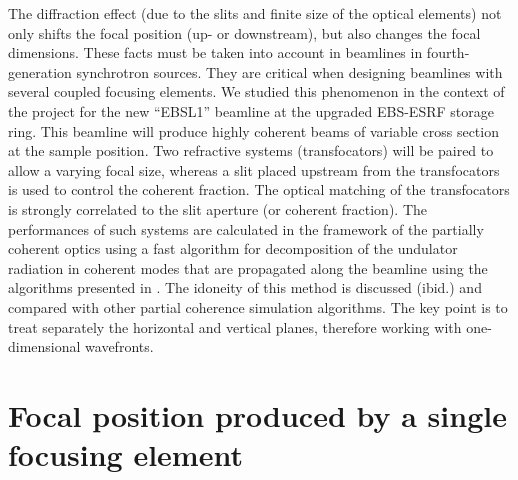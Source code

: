 \documentclass[doublecol]{epl2}
\begin{document}
The diffraction effect (due to the slits and finite size of the optical elements) not only shifts the focal position (up- or downstream), but also changes the focal dimensions. These facts must be taken into account in beamlines in fourth-generation synchrotron sources. They are critical when designing beamlines with several coupled focusing elements. We studied this phenomenon in the context of the project for the new ``EBSL1'' beamline at the upgraded EBS-ESRF storage ring. This beamline will produce highly coherent beams of variable cross section at the sample position. Two refractive systems (transfocators) will be paired to allow a varying focal size, whereas a slit placed upstream from the transfocators is used to control the coherent fraction. The optical matching of the transfocators is strongly correlated to the slit aperture (or coherent fraction). The performances of such systems are calculated in the framework of the partially coherent optics using a fast algorithm for decomposition of the undulator radiation in coherent modes that are propagated along the beamline using the algorithms presented in \cite{multioptics}. The idoneity of this method is discussed (ibid.) and compared with other partial coherence simulation algorithms. The key point is to treat separately the horizontal and vertical planes, therefore working with one-dimensional wavefronts.




\section{Focal position produced by a single focusing element}
\label{sec:onelens}
\end{document}
